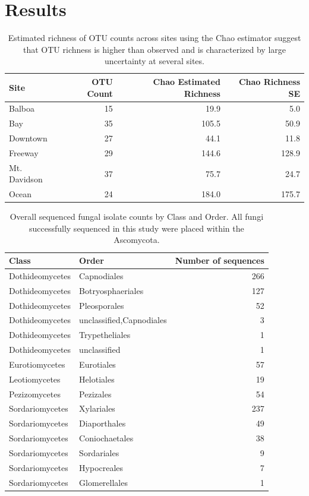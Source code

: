 \documentclass[fleqn,10pt,lineno]{wlpeerj} %
\begin{document}
\hypertarget{results}{%
\section*{Results}\label{results}}

\begin{table}[!h]

\caption{\label{tab:chao-richness-table}Estimated richness of OTU counts across sites using the Chao estimator suggest that OTU richness is higher than observed and is characterized by large uncertainty at several sites.}
\centering
\begin{tabular}[t]{lrrr}
\toprule
Site & OTU Count & Chao Estimated Richness & Chao Richness SE\\
\midrule
Balboa & 15 & 19.9 & 5.0\\
Bay & 35 & 105.5 & 50.9\\
Downtown & 27 & 44.1 & 11.8\\
Freeway & 29 & 144.6 & 128.9\\
Mt. Davidson & 37 & 75.7 & 24.7\\
Ocean & 24 & 184.0 & 175.7\\
\bottomrule
\end{tabular}
\end{table}

\begin{table}[!h]

\caption{\label{tab:class-abundance-table}Overall sequenced fungal isolate counts by Class and Order. All fungi successfully  sequenced in this study were placed within the Ascomycota.}
\centering
\begin{tabular}[t]{llr}
\toprule
Class & Order & Number of sequences\\
\midrule
Dothideomycetes & Capnodiales & 266\\
Dothideomycetes & Botryosphaeriales & 127\\
Dothideomycetes & Pleosporales & 52\\
Dothideomycetes & unclassified,Capnodiales & 3\\
Dothideomycetes & Trypetheliales & 1\\
Dothideomycetes & unclassified & 1\\
\addlinespace
Eurotiomycetes & Eurotiales & 57\\
\addlinespace
Leotiomycetes & Helotiales & 19\\
\addlinespace
Pezizomycetes & Pezizales & 54\\
\addlinespace
Sordariomycetes & Xylariales & 237\\
Sordariomycetes & Diaporthales & 49\\
Sordariomycetes & Coniochaetales & 38\\
Sordariomycetes & Sordariales & 9\\
Sordariomycetes & Hypocreales & 7\\
Sordariomycetes & Glomerellales & 1\\
\bottomrule
\end{tabular}
\end{table}
\end{document}
